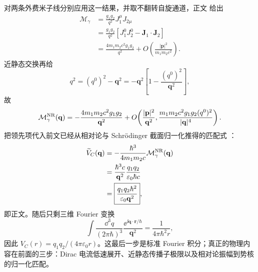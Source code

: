 \begin{derivation}
对两条外费米子线分别应用这一结果，并取不翻转自旋通道，正文 给出
\begin{align*}
 \mathcal M_\gamma
 &=\frac{g_1g_2}{q^2}
 J_1^\mu J_{2\mu}\\
 &=\frac{g_1g_2}{q^2}
 \left[J_1^0J_2^0-\mathbf J_1\cdot\mathbf J_2\right]\\
 &=\frac{4m_1m_2c^2g_1g_2}{q^2}
 +O\!\left(\frac{|\mathbf p|^2}{m_1m_2c^2}\right).
\end{align*}
近静态交换再给
\begin{equation*}
 q^2=(q^0)^2-\mathbf q^2
 =-\mathbf q^2\left[
 1-\frac{(q^0)^2}{\mathbf q^2}
 \right],
\end{equation*}
故
\begin{equation*}
 \mathcal M_\gamma^{\rm NR}(\mathbf q)
 =-\frac{4m_1m_2c^2g_1g_2}{\mathbf q^2}
 +O\!\left(
 \frac{|\mathbf p|^2}{\mathbf q^2},
 \frac{m_1m_2c^2g_1g_2(q^0)^2}{|\mathbf q|^4}
 \right).
\end{equation*}
把领先项代入前文已经从相对论与 Schrödinger 截面归一化推得的匹配式
：
\begin{align*}
 \widetilde V_C(\mathbf q)
 &=-\frac{\hbar^3}{4m_1m_2c}
 \mathcal M_\gamma^{\rm NR}(\mathbf q)\\
 &=\frac{\hbar^3c}{\mathbf q^2}
 \frac{q_1q_2}{\varepsilon_0\hbar c}\\
 &=\boxed{\frac{q_1q_2\hbar^2}
 {\varepsilon_0\mathbf q^2}},
\end{align*}
即正文。随后只剩三维 Fourier 变换
\begin{equation*}
 \int\frac{\dd^3q}{(2\pi\hbar)^3}
 \frac{\ee^{\ii\mathbf q\cdot\mathbf r/\hbar}}{\mathbf q^2}
 =\frac{1}{4\pi\hbar^2r},
\end{equation*}
因此
$V_C(r)=q_1q_2/(4\pi\varepsilon_0r)$。这最后一步是标准 Fourier 积分；真正的物理内容在前面的三步：Dirac 电流低速展开、近静态传播子极限以及相对论振幅到势核的归一化匹配。
\end{derivation}



